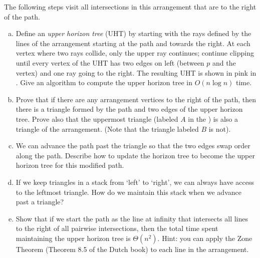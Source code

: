 \documentclass{article}
\begin{document}
The following steps
visit all intersections in this arrangement that are to the right of the path.

\begin{enumerate}[(a)]
    \item Define an \emph{upper horizon tree} (UHT) by starting with the rays defined
        by the lines of the
        arrangement starting at the path and towards the right. At each vertex where
        two rays collide, only the upper ray continues; continue clipping until
        every vertex of the UHT has two edges on left (between $p$ and the
        vertex) and one ray going to the right.
        The resulting UHT is
        shown in pink in
        . Give an algorithm to
        compute the upper horizon tree in $O(n \log n)$ time.


    \item Prove that if there are any arrangement vertices to the right of the
        path, then there is a triangle formed by the path and two edges of the
        upper horizon tree.  Prove also that the uppermost triangle (labeled
        $A$ in the ) is also a triangle of the arrangement.  (Note that
        the triangle labeled $B$ is not).


    \item We can advance the path past the triangle so that the two edges swap
        order along the path.  Describe how to update the horizon tree to become
        the upper horizon tree for this modified path.


    \item If we keep triangles in a stack from `left' to `right', we can always have
        access to the leftmost triangle.  How do we maintain this stack when we
        advance past a triangle?


    \item Show that if we start the path as the line at infinity that intersects
        all lines to the right of all pairwise intersections, then
        the total time spent maintaining the upper horizon tree is
        $\Theta(n^2)$.  Hint: you can apply the Zone Theorem (Theorem 8.5 of the
        Dutch book) to each line in the arrangement.


\end{enumerate}
\end{document}
